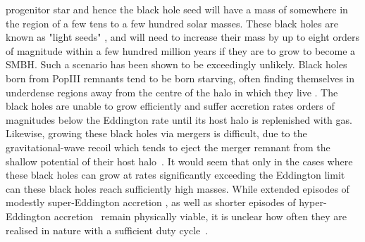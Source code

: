\documentclass[graphics, twocolumn, usenatbib]{mn2e}
\begin{document}
progenitor star and hence the black hole seed will have a mass of somewhere in the region of a
few tens to a few hundred solar masses. These black holes are known as "light seeds" \citep[e.g.][]{Volonteri_2010a}, and will need to increase their mass by up to
eight orders of magnitude within a few hundred million years if they are to grow to become a SMBH. Such
a scenario has been shown to be exceedingly unlikely. Black holes born from PopIII remnants tend to
be born starving, often finding themselves in underdense regions away from the centre of the halo in
which they live \citep{Whalen_2004, Milosavljevic_2009, Alvarez_2009, Smith_2018}. The black holes
are unable to grow efficiently and suffer accretion rates orders of magnitudes below the Eddington
rate until its host halo is replenished with gas. 
Likewise, growing these black holes via mergers is difficult, due to the gravitational-wave recoil which tends to eject the merger remnant from the shallow potential of their host halo~\citep{Haiman_2004}.
It would seem that only in the cases where these 
black holes can grow at rates significantly
exceeding the Eddington limit can these black holes reach sufficiently high masses. While extended episodes of modestly 
super-Eddington accretion \citep{Madau_2001, Madau_2014, Alexander_2014,
  Lupi_2016}, as well as shorter episodes of hyper-Eddington accretion~\citep{Inayoshi_2018} remain physically viable, it is unclear how often they are realised in nature with a sufficient duty cycle~\citep{Pacucci_2017}.
\end{document}

